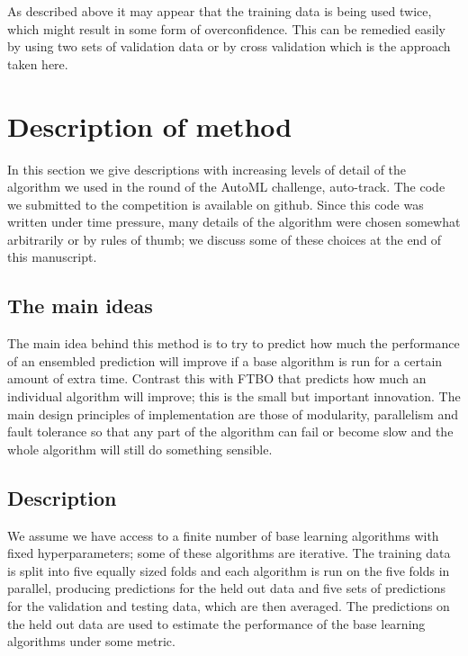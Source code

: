 \documentclass{article} %
\begin{document}

As described above it may appear that the training data is being used twice, which might result in some form of overconfidence.
This can be remedied easily by using two sets of validation data or by cross validation which is the approach taken here.

\section{Description of method}
\label{sec:method}

In this section we give descriptions with increasing levels of detail of the algorithm we used in the  round of the AutoML challenge, auto-track.
The code we submitted to the competition is available on github\footnotemark{}.
Since this code was written under time pressure, many details of the algorithm were chosen somewhat arbitrarily or by rules of thumb; we discuss some of these choices at the end of this manuscript.

\footnotetext{[Redacted]}

\subsection{The main ideas}

The main idea behind this method is to try to predict how much the performance of an ensembled prediction will improve if a base algorithm is run for a certain amount of extra time.
Contrast this with FTBO that predicts how much an individual algorithm will improve; this is the small but important innovation.
The main design principles of implementation are those of modularity, parallelism and fault tolerance so that any part of the algorithm can fail or become slow and the whole algorithm will still do something sensible.

\subsection{Description}

We assume we have access to a finite number of base learning algorithms with fixed hyperparameters; some of these algorithms are iterative.
The training data is split into five equally sized folds and each algorithm is run on the five folds in parallel, producing predictions for the held out data and five sets of predictions for the validation and testing data, which are then averaged.
The predictions on the held out data are used to estimate the performance of the base learning algorithms under some metric.
\end{document}
